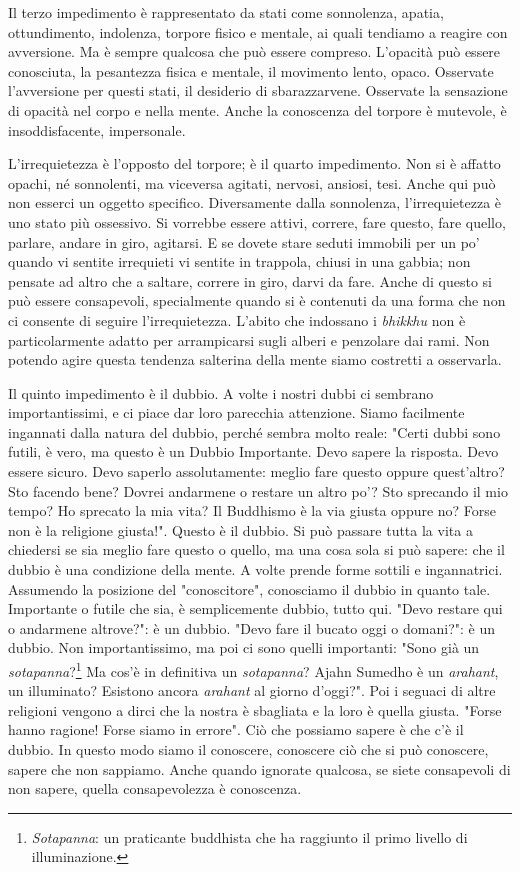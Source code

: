 Il terzo impedimento è rappresentato da stati come sonnolenza, apatia,
ottundimento, indolenza, torpore fisico e mentale, ai quali tendiamo a
reagire con avversione. Ma è sempre qualcosa che può essere compreso.
L'opacità può essere conosciuta, la pesantezza fisica e mentale, il
movimento lento, opaco. Osservate l'avversione per questi stati, il
desiderio di sbarazzarvene. Osservate la sensazione di opacità nel corpo
e nella mente. Anche la conoscenza del torpore è mutevole, è
insoddisfacente, impersonale.

L'irrequietezza è l'opposto del torpore; è il quarto impedimento. Non si
è affatto opachi, né sonnolenti, ma viceversa agitati, nervosi, ansiosi,
tesi. Anche qui può non esserci un oggetto specifico. Diversamente dalla
sonnolenza, l'irrequietezza è uno stato più ossessivo. Si vorrebbe
essere attivi, correre, fare questo, fare quello, parlare, andare in
giro, agitarsi. E se dovete stare seduti immobili per un po' quando vi
sentite irrequieti vi sentite in trappola, chiusi in una gabbia; non
pensate ad altro che a saltare, correre in giro, darvi da fare. Anche di
questo si può essere consapevoli, specialmente quando si è contenuti da
una forma che non ci consente di seguire l'irrequietezza. L'abito che
indossano i \textit{bhikkhu} non è particolarmente adatto per arrampicarsi sugli
alberi e penzolare dai rami. Non potendo agire questa tendenza salterina
della mente siamo costretti a osservarla.

Il quinto impedimento è il dubbio. A volte i nostri dubbi ci sembrano
importantissimi, e ci piace dar loro parecchia attenzione. Siamo
facilmente ingannati dalla natura del dubbio, perché sembra molto reale:
"Certi dubbi sono futili, è vero, ma questo è un Dubbio Importante. Devo
sapere la risposta. Devo essere sicuro. Devo saperlo assolutamente:
meglio fare questo oppure quest'altro? Sto facendo bene? Dovrei
andarmene o restare un altro po'? Sto sprecando il mio tempo? Ho
sprecato la mia vita? Il Buddhismo è la via giusta oppure no? Forse non
è la religione giusta!". Questo è il dubbio. Si può passare tutta la
vita a chiedersi se sia meglio fare questo o quello, ma una cosa sola si
può sapere: che il dubbio è una condizione della mente. A volte prende
forme sottili e ingannatrici. Assumendo la posizione del "conoscitore",
conosciamo il dubbio in quanto tale. Importante o futile che sia, è
semplicemente dubbio, tutto qui. "Devo restare qui o andarmene
altrove?": è un dubbio. "Devo fare il bucato oggi o domani?": è un
dubbio. Non importantissimo, ma poi ci sono quelli importanti: "Sono già
un \textit{sotapanna}?\footnote{\textit{Sotapanna}: un praticante buddhista che ha raggiunto il
primo livello di illuminazione.} Ma cos'è in definitiva un \textit{sotapanna}? Ajahn
Sumedho è un \textit{arahant}, un illuminato? Esistono ancora \textit{arahant} al giorno
d'oggi?". Poi i seguaci di altre religioni vengono a dirci che la nostra
è sbagliata e la loro è quella giusta. "Forse hanno ragione! Forse siamo
in errore". Ciò che possiamo sapere è che c'è il dubbio. In questo modo
siamo il conoscere, conoscere ciò che si può conoscere, sapere che non
sappiamo. Anche quando ignorate qualcosa, se siete consapevoli di non
sapere, quella consapevolezza è conoscenza.

